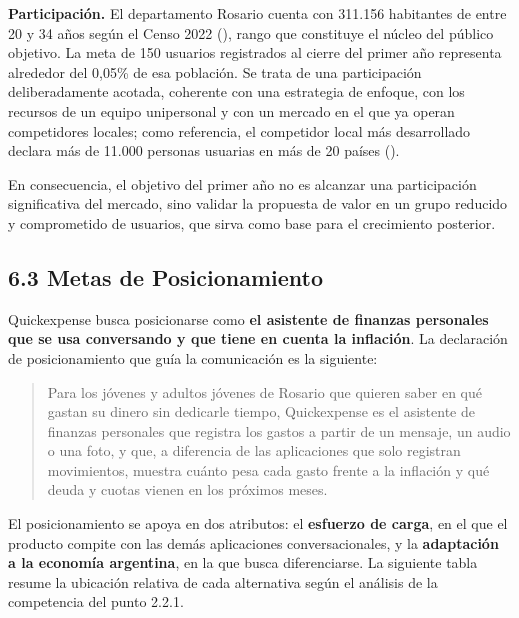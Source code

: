 \textbf{Participación.} El departamento Rosario cuenta con 311.156
habitantes de entre 20 y 34 años según el Censo 2022
(), rango que constituye el
núcleo del público objetivo. La meta de 150 usuarios registrados al
cierre del primer año representa alrededor del 0,05\% de esa población.
Se trata de una participación deliberadamente acotada, coherente con una
estrategia de enfoque, con los recursos de un equipo unipersonal y con
un mercado en el que ya operan competidores locales; como referencia, el
competidor local más desarrollado declara más de 11.000 personas
usuarias en más de 20 países ().

En consecuencia, el objetivo del primer año no es alcanzar una
participación significativa del mercado, sino validar la propuesta de
valor en un grupo reducido y comprometido de usuarios, que sirva como
base para el crecimiento posterior.

\subsection*{6.3 Metas de
Posicionamiento}\label{metas-de-posicionamiento}

Quickexpense busca posicionarse como \textbf{el asistente de finanzas
personales que se usa conversando y que tiene en cuenta la inflación}.
La declaración de posicionamiento que guía la comunicación es la
siguiente:

\begin{quote}
Para los jóvenes y adultos jóvenes de Rosario que quieren saber en qué
gastan su dinero sin dedicarle tiempo, Quickexpense es el asistente de
finanzas personales que registra los gastos a partir de un mensaje, un
audio o una foto, y que, a diferencia de las aplicaciones que solo
registran movimientos, muestra cuánto pesa cada gasto frente a la
inflación y qué deuda y cuotas vienen en los próximos meses.
\end{quote}

El posicionamiento se apoya en dos atributos: el \textbf{esfuerzo de
carga}, en el que el producto compite con las demás aplicaciones
conversacionales, y la \textbf{adaptación a la economía argentina}, en
la que busca diferenciarse. La siguiente tabla resume la ubicación
relativa de cada alternativa según el análisis de la competencia del
punto 2.2.1.

